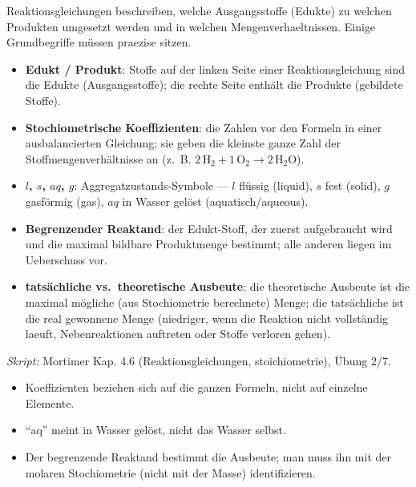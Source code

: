 

Reaktionsgleichungen beschreiben, welche Ausgangsstoffe (Edukte) zu welchen
Produkten umgesetzt werden und in welchen Mengenverhaeltnissen. Einige
Grundbegriffe müssen praezise sitzen.

\begin{werkzeugkasten}
\begin{itemize}
  \item \textbf{Edukt / Produkt}: Stoffe auf der linken Seite einer
        Reaktionsgleichung sind die Edukte (Ausgangsstoffe); die rechte Seite
        enthält die Produkte (gebildete Stoffe).
  \item \textbf{Stochiometrische Koeffizienten}: die Zahlen vor den Formeln in
        einer ausbalancierten Gleichung; sie geben die kleinste ganze Zahl der
        Stoffmengenverhältnisse an (z.~B. $2\,\mathrm{H_2} +
        1\,\mathrm{O_2} \to 2\,\mathrm{H_2O}$).
  \item \textbf{$l$, $s$, $aq$, $g$}: Aggregatzustands-Symbole --- $l$
        flüssig (liquid), $s$ fest (solid), $g$ gasförmig (gas),
        $aq$ in Wasser gelöst (aquatisch/aqueous).
  \item \textbf{Begrenzender Reaktand}: der Edukt-Stoff, der zuerst
        aufgebraucht wird und die maximal bildbare Produktmenge bestimmt; alle
        anderen liegen im Ueberschuss vor.
  \item \textbf{tatsächliche vs.\ theoretische Ausbeute}: die theoretische
        Ausbeute ist die maximal mögliche (aus Stochiometrie berechnete)
        Menge; die tatsächliche ist die real gewonnene Menge (niedriger,
        wenn die Reaktion nicht vollständig laeuft, Nebenreaktionen
        auftreten oder Stoffe verloren gehen).
\end{itemize}
\textit{Skript:} Mortimer Kap. 4.6 (Reaktionsgleichungen, stoichiometrie),
Übung 2/7.
\end{werkzeugkasten}

\begin{achtung}
\begin{itemize}
  \item Koeffizienten beziehen sich auf die ganzen Formeln, nicht auf einzelne
        Elemente.
  \item ``aq'' meint in Wasser gelöst, nicht das Wasser selbst.
  \item Der begrenzende Reaktand bestimmt die Ausbeute; man muss ihn mit der
        molaren Stochiometrie (nicht mit der Masse) identifizieren.
\end{itemize}
\end{achtung}
